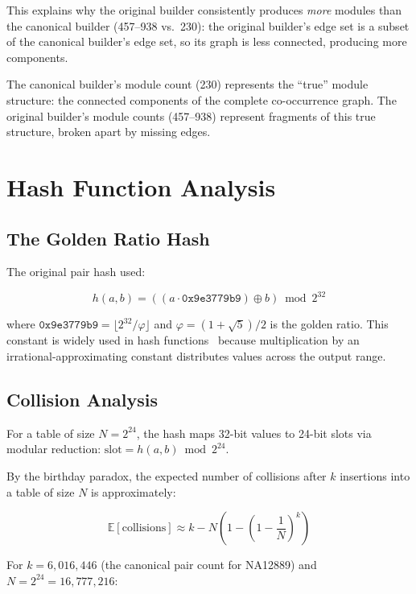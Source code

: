 \documentclass{../yalumba}
\begin{document}
This explains why the original builder consistently produces \textit{more}
modules than the canonical builder (457--938 vs.\ 230): the original builder's
edge set is a subset of the canonical builder's edge set, so its graph is less
connected, producing more components.

The canonical builder's module count (230) represents the ``true'' module
structure: the connected components of the complete co-occurrence graph. The
original builder's module counts (457--938) represent fragments of this true
structure, broken apart by missing edges.


\section{Hash Function Analysis}
\label{app:hash}

\subsection{The Golden Ratio Hash}

The original pair hash used:

\begin{equation}
  h(a, b) = ((a \cdot \texttt{0x9e3779b9}) \oplus b) \bmod 2^{32}
\end{equation}

where $\texttt{0x9e3779b9} = \lfloor 2^{32} / \varphi \rfloor$ and
$\varphi = (1 + \sqrt{5})/2$ is the golden ratio. This constant is widely
used in hash functions~\cite{leskovec2010empirical} because multiplication
by an irrational-approximating constant distributes values across the output
range.

\subsection{Collision Analysis}

For a table of size $N = 2^{24}$, the hash maps 32-bit values to 24-bit
slots via modular reduction: $\text{slot} = h(a,b) \bmod 2^{24}$.

By the birthday paradox, the expected number of collisions after $k$ insertions
into a table of size $N$ is approximately:

\begin{equation}
  \mathbb{E}[\text{collisions}] \approx k - N\left(1 - \left(1 - \frac{1}{N}\right)^k\right)
\end{equation}

For $k = 6{,}016{,}446$ (the canonical pair count for NA12889) and
$N = 2^{24} = 16{,}777{,}216$:
\end{document}
